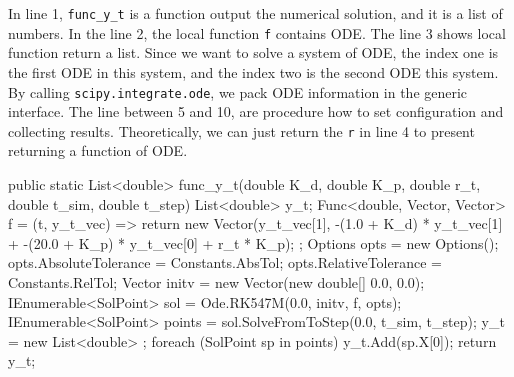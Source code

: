 In line 1, \verb|func_y_t| is a function output the numerical solution, and it is a list of numbers. In the line 2, the local function \verb|f| contains ODE. The line 3 shows local function return a list. Since we want to solve a system of ODE, the index one is the first ODE in this system, and the index two is the second ODE this system. By calling \verb|scipy.integrate.ode|, we pack ODE information in the generic interface. The line between 5 and 10, are procedure how to set configuration and collecting results. Theoretically, we can just return the \verb|r| in line 4 to present returning a function of ODE.

\begin{listing}
\begin{csharp1}
public static List<double> func_y_t(double K_d, double K_p, double r_t, double t_sim, double t_step) {
	List<double> y_t;
	Func<double, Vector, Vector> f = (t, y_t_vec) => {
		return new Vector(y_t_vec[1], -(1.0 + K_d) * y_t_vec[1] + -(20.0 + K_p) * y_t_vec[0] + r_t * K_p);
	};
	Options opts = new Options();
	opts.AbsoluteTolerance = Constants.AbsTol;
	opts.RelativeTolerance = Constants.RelTol;
	Vector initv = new Vector(new double[] {0.0, 0.0});
	IEnumerable<SolPoint> sol = Ode.RK547M(0.0, initv, f, opts);
	IEnumerable<SolPoint> points = sol.SolveFromToStep(0.0, t_sim, t_step);
	y_t = new List<double> {};
	foreach (SolPoint sp in points) {
		y_t.Add(sp.X[0]);
	}
	return y_t;
}
\end{csharp1}
\label{code_csharposlo}
\end{listing}

